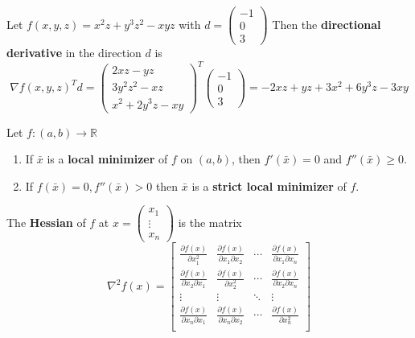 \begin{problem}
    Let $f(x,y,z) = x^2z + y^3z^2 - xyz$ with $d = \begin{pmatrix}
        -1 \\ 0 \\ 3
    \end{pmatrix}$ Then the \textbf{directional derivative} in the direction $d$ is
    $$\nabla f(x,y,z)^T d = \begin{pmatrix}
        2xz - yz \\
        3y^2z^2 - xz \\
        x^2 + 2y^3z - xy
    \end{pmatrix}^{T} \begin{pmatrix}
        -1 \\ 0 \\ 3
    \end{pmatrix} = -2xz + yz + 3x^2 + 6y^3z - 3xy$$
\end{problem}
\begin{corollary}
    Let $f: (a,b) \rightarrow \mathbb R$
    \begin{enumerate}
        \item If $\bar x$ is a \textbf{local minimizer} of $f$ on $(a,b)$, then $f'(\bar x) = 0$ and $f''(\bar x) \geq 0$.
        \item If $f(\bar x) = 0, f''(\bar x) > 0$ then $\bar x$ is a \textbf{strict local minimizer} of $f$.
    \end{enumerate}
\end{corollary}
\begin{definition}[Hessian]
    The \textbf{Hessian} of $f$ at $x = \begin{pmatrix}
        x_1 \\ \vdots \\ x_n
    \end{pmatrix}$ is the matrix
    $$\nabla^2 f(x) = \begin{bmatrix}
        \frac{\partial f(x)}{\partial x^2_1} & \frac{\partial f(x)}{\partial x_1 \partial x_2} & \cdots & \frac{\partial f(x)}{\partial x_1 \partial x_n} \\
        \frac{\partial f(x)}{\partial x_2 \partial x_1} & \frac{\partial f(x)}{\partial x_2^2} & \cdots & \frac{\partial f(x)}{\partial x_2 \partial x_n} \\
        \vdots & \vdots & \ddots & \vdots \\
        \frac{\partial f(x)}{\partial x_n \partial x_1} & \frac{\partial f(x)}{\partial x_n \partial x_2} & \cdots & \frac{\partial f(x)}{\partial x_n^2} \\
    \end{bmatrix}$$
\end{definition}
